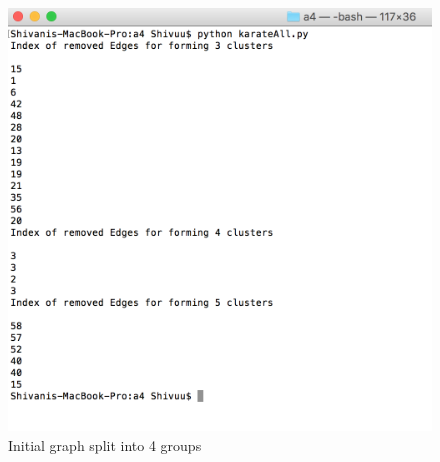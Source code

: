 \documentclass[12pt]{article}
\begin{document}
\begin{figure}[ht]
\includegraphics[scale=0.9]{../qn2/screen2.png}
\centering
\caption{Initial graph split into 4 groups}
\label{Initial graph split into 4 groups}
\end{figure}







\newpage







\cite{*}
\end{document}
